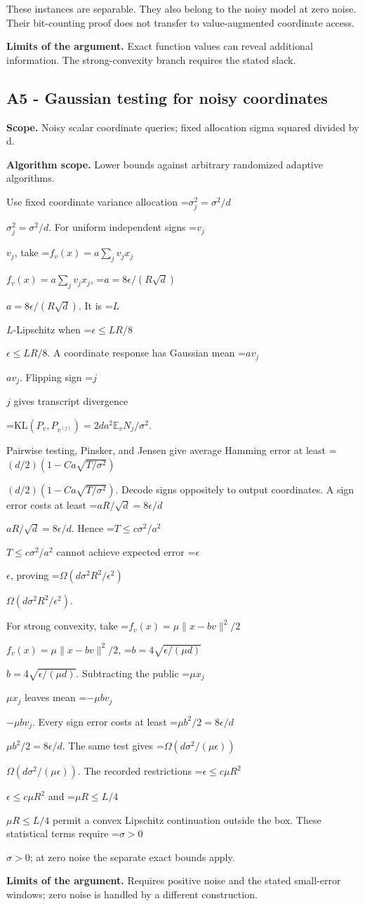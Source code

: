 \documentclass[10pt,a4paper]{article}
\newcommand{\AtlasMath}[1]{\par\begingroup\centering\setbox0=\hbox{$\displaystyle #1$}\ifdim\wd0>1.4\linewidth\typeout{ATLAS WIDE FORMULA: \the\wd0}\fi\ifdim\wd0>\linewidth\resizebox{\linewidth}{!}{\box0}\else\box0\fi\par\endgroup}
\newcommand{\AtlasInlineMath}[1]{\begingroup\setbox0=\hbox{$#1$}\ifdim\wd0>.4\linewidth\endgroup\AtlasMath{#1}\else\endgroup$#1$\fi}
\begin{document}
These instances are separable. They also belong to the noisy model at zero noise. Their bit-counting proof does not transfer to value-augmented coordinate access.

\textbf{Limits of the argument.} Exact function values can reveal additional information. The strong-convexity branch requires the stated slack.

\subsection{A5 - Gaussian testing for noisy coordinates}
\textbf{Scope.} Noisy scalar coordinate queries; fixed allocation sigma squared divided by d.

\textbf{Algorithm scope.} Lower bounds against arbitrary randomized adaptive algorithms.

Use fixed coordinate variance allocation \AtlasInlineMath{\sigma_j^2=\sigma^2/d}. For uniform independent signs \AtlasInlineMath{v_j}, take
\AtlasInlineMath{f_v(x)=a\sum_jv_jx_j}, \AtlasInlineMath{a=8\epsilon/(R\sqrt d)}.
It is \AtlasInlineMath{L}-Lipschitz when \AtlasInlineMath{\epsilon\le LR/8}.
A coordinate response has Gaussian mean \AtlasInlineMath{av_j}. Flipping sign \AtlasInlineMath{j} gives transcript divergence

\AtlasMath{\mathrm{KL}(P_v,P_{v^{(j)}})=2da^2\mathbb E_vN_j/\sigma^2.}

Pairwise testing, Pinsker, and Jensen give average Hamming error at least
\AtlasInlineMath{(d/2)(1-Ca\sqrt{T/\sigma^2})}.
Decode signs oppositely to output coordinates. A sign error costs at least \AtlasInlineMath{aR/\sqrt d=8\epsilon/d}. Hence
\AtlasInlineMath{T\le c\sigma^2/a^2} cannot achieve expected error \AtlasInlineMath{\epsilon}, proving
\AtlasInlineMath{\Omega(d\sigma^2R^2/\epsilon^2)}.

For strong convexity, take \AtlasInlineMath{f_v(x)=\mu\|x-bv\|^2/2},
\AtlasInlineMath{b=4\sqrt{\epsilon/(\mu d)}}.
Subtracting the public \AtlasInlineMath{\mu x_j} leaves mean \AtlasInlineMath{-\mu bv_j}. Every sign error costs at least \AtlasInlineMath{\mu b^2/2=8\epsilon/d}. The same test gives
\AtlasInlineMath{\Omega(d\sigma^2/(\mu\epsilon))}.
The recorded restrictions \AtlasInlineMath{\epsilon\le c\mu R^2} and \AtlasInlineMath{\mu R\le L/4} permit a convex Lipschitz continuation outside the box. These statistical terms require \AtlasInlineMath{\sigma>0}; at zero noise the separate exact bounds apply.

\textbf{Limits of the argument.} Requires positive noise and the stated small-error windows; zero noise is handled by a different construction.
\end{document}
